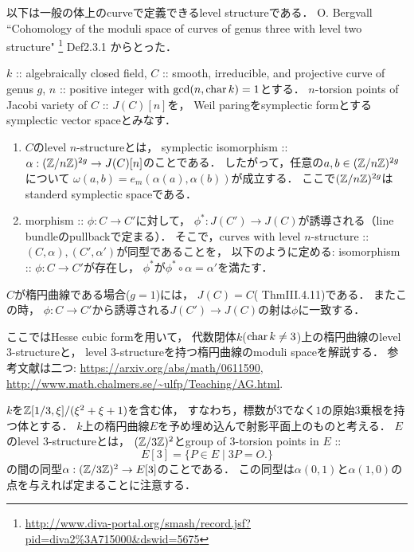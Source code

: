 \documentclass[a4paper]{jsarticle}
\begin{document}
    以下は一般の体上のcurveで定義できるlevel structureである．
    O. Bergvall
    ``Cohomology of the moduli space of curves of genus three with level two structure" 
    \footnote{\url{http://www.diva-portal.org/smash/record.jsf?pid=diva2\%3A715000&dswid=5675}}
    Def2.3.1
    からとった．
    \begin{Def}[]
        $k$ :: algebraically closed field,
        $C$ :: smooth, irreducible, and projective curve of genus $g$,
        $n$ :: positive integer with $\gcd(n,\operatorname{char} k)=1$とする．
        $n$-torsion points of Jacobi variety of $C$ :: $J(C)[n]$を，
        Weil paringをsymplectic formとする
        symplectic vector spaceとみなす．

        \begin{enumerate}[label=(\roman*), leftmargin=*]
            \item 
            $C$のlevel $n$-structureとは，
            symplectic isomorphism :: $\alpha: (\mathbb{Z}/n\mathbb{Z})^{2g} \to J(C)[n]$のことである．
            したがって，任意の$a,b \in (\mathbb{Z}/n\mathbb{Z})^{2g}$について
            $\omega(a, b)=e_m(\alpha(a), \alpha(b))$が成立する．
            ここで$(\mathbb{Z}/n\mathbb{Z})^{2g}$はstanderd symplectic spaceである．

            \item
            morphism :: $\phi: C \to C'$に対して，
            $\phi^*: J(C') \to J(C)$が誘導される（line bundleのpullbackで定まる）．
            そこで，curves with level $n$-structure :: $(C, \alpha), (C', \alpha')$が同型であることを，
            以下のように定める:
            isomorphism :: $\phi: C \to C'$が存在し，
            $\phi^*$が$\phi^* \circ \alpha=\alpha'$を満たす．
        \end{enumerate}
    \end{Def}
    $C$が楕円曲線である場合($g=1$)には，
    $J(C)=C$(\cite{HarAG} ThmIII.4.11)である．
    またこの時，
    $\phi: C \to C'$から誘導される$J(C') \to J(C)$の射は$\phi$に一致する．

    ここではHesse cubic formを用いて，
    代数閉体$k$($\operatorname{char} k \neq 3$)上の楕円曲線のlevel $3$-structureと，
    level $3$-structureを持つ楕円曲線のmoduli spaceを解説する．
    参考文献は二つ:
    \url{https://arxiv.org/abs/math/0611590}, 
    \url{http://www.math.chalmers.se/~ulfp/Teaching/AG.html}.

    $k$を$\mathbb{Z}[1/3, \xi]/(\xi^2+\xi+1)$を含む体，
    すなわち，標数が$3$でなく$1$の原始$3$乗根を持つ体とする．
    $k$上の楕円曲線$E$を予め埋め込んで射影平面上のものと考える．
    $E$のlevel $3$-structureとは，
    $(\mathbb{Z}/3\mathbb{Z})^2$とgroup of $3$-torsion points in $E$ :: 
    \[ E[3]=\{ P \in E \mid 3P=O. \} \]
    の間の同型$\alpha: (\mathbb{Z}/3\mathbb{Z})^2 \to E[3]$のことである．
    この同型は$\alpha(0, 1)$と$\alpha(1, 0)$の点を与えれば定まることに注意する．
\end{document}
